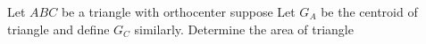 Let $ABC$ be a triangle with orthocenter  suppose    Let $G_A$ be the centroid of triangle  and define  $G_C$ similarly. Determine the area of triangle 